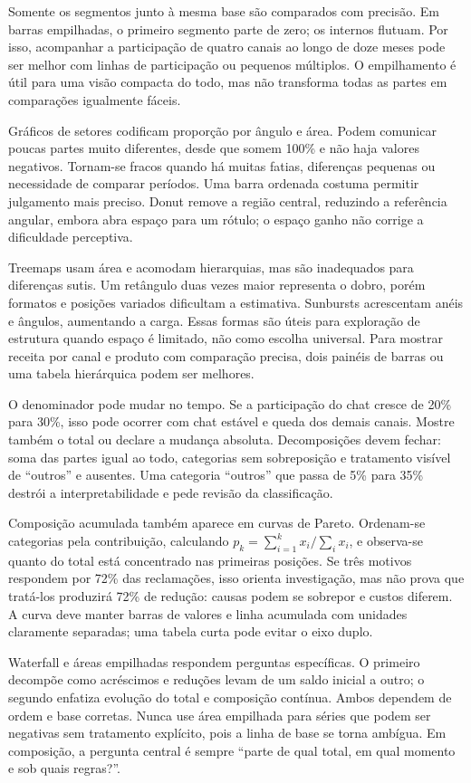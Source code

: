 Somente os segmentos junto à mesma base são comparados com precisão. Em barras empilhadas, o primeiro segmento parte de zero; os internos flutuam. Por isso, acompanhar a participação de quatro canais ao longo de doze meses pode ser melhor com linhas de participação ou pequenos múltiplos. O empilhamento é útil para uma visão compacta do todo, mas não transforma todas as partes em comparações igualmente fáceis.

Gráficos de setores codificam proporção por ângulo e área. Podem comunicar poucas partes muito diferentes, desde que somem 100\% e não haja valores negativos. Tornam-se fracos quando há muitas fatias, diferenças pequenas ou necessidade de comparar períodos. Uma barra ordenada costuma permitir julgamento mais preciso. Donut remove a região central, reduzindo a referência angular, embora abra espaço para um rótulo; o espaço ganho não corrige a dificuldade perceptiva.

Treemaps usam área e acomodam hierarquias, mas são inadequados para diferenças sutis. Um retângulo duas vezes maior representa o dobro, porém formatos e posições variados dificultam a estimativa. Sunbursts acrescentam anéis e ângulos, aumentando a carga. Essas formas são úteis para exploração de estrutura quando espaço é limitado, não como escolha universal. Para mostrar receita por canal e produto com comparação precisa, dois painéis de barras ou uma tabela hierárquica podem ser melhores.

O denominador pode mudar no tempo. Se a participação do chat cresce de 20\% para 30\%, isso pode ocorrer com chat estável e queda dos demais canais. Mostre também o total ou declare a mudança absoluta. Decomposições devem fechar: soma das partes igual ao todo, categorias sem sobreposição e tratamento visível de ``outros'' e ausentes. Uma categoria ``outros'' que passa de 5\% para 35\% destrói a interpretabilidade e pede revisão da classificação.

Composição acumulada também aparece em curvas de Pareto. Ordenam-se categorias pela contribuição, calculando $p_k=\sum_{i=1}^{k}x_i/\sum_i x_i$, e observa-se quanto do total está concentrado nas primeiras posições. Se três motivos respondem por 72\% das reclamações, isso orienta investigação, mas não prova que tratá-los produzirá 72\% de redução: causas podem se sobrepor e custos diferem. A curva deve manter barras de valores e linha acumulada com unidades claramente separadas; uma tabela curta pode evitar o eixo duplo.

Waterfall e áreas empilhadas respondem perguntas específicas. O primeiro decompõe como acréscimos e reduções levam de um saldo inicial a outro; o segundo enfatiza evolução do total e composição contínua. Ambos dependem de ordem e base corretas. Nunca use área empilhada para séries que podem ser negativas sem tratamento explícito, pois a linha de base se torna ambígua. Em composição, a pergunta central é sempre ``parte de qual total, em qual momento e sob quais regras?''.



